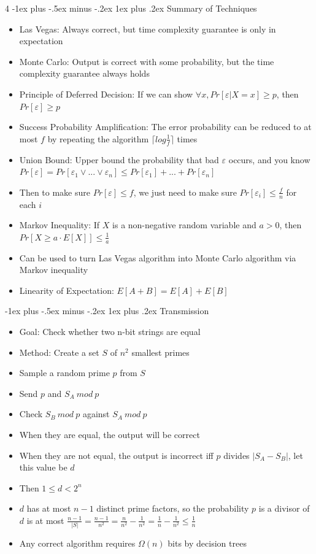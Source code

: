 \documentclass[10pt, landscape]{article}
\makeatletter
\renewcommand{\subsection}{\@startsection{subsection}{3}{0mm}%
                                {-1ex plus -.5ex minus -.2ex}%
                                {1ex plus .2ex}%
                                {\normalfont\small\bfseries}}%
\makeatother
\begin{document}
\begin{multicols*}{4}
\subsection{Summary of Techniques}
\begin{itemize}
    \item Las Vegas: Always correct, but time complexity guarantee is only in expectation
    \item Monte Carlo: Output is correct with some probability, but the time complexity guarantee always holds
    \item Principle of Deferred Decision: If we can show $\forall x , Pr[\varepsilon|X=x]\geq p$, then $Pr[\varepsilon]\geq p$
    \item Success Probability Amplification: The error probability can be reduced to at most $f$ by repeating the algorithm $\lceil log \frac{1}{f} \rceil$ times
    \item Union Bound: Upper bound the probability that bad $\varepsilon$ occurs, and you know $Pr[\varepsilon] =Pr[\varepsilon_1\lor ...\lor\varepsilon_n]\leq Pr[\varepsilon_1]+...+Pr[\varepsilon_n]$
    \item Then to make sure $Pr[\varepsilon]\leq f$, we just need to make sure $Pr[\varepsilon_i]\leq \frac{f}{n}$ for each $i$
    \item Markov Inequality: If $X$ is a non-negative random variable and $a>0$, then $Pr[X \geq a \cdot E[X]] \leq \frac{1}{a}$
    \item Can be used to turn Las Vegas algorithm into Monte Carlo algorithm via Markov inequality
    \item Linearity of Expectation: $E[A+B]=E[A]+E[B]$
\end{itemize}

\subsection{Transmission}
\begin{itemize}
    \item Goal: Check whether two n-bit strings are equal
    \item Method: Create a set $S$ of $n^2$ smallest primes
    \item Sample a random prime $p$ from $S$
    \item Send $p$ and $S_A\ mod\ p$
    \item Check $S_B\ mod\ p$ against $S_A\ mod\ p$
    \item When they are equal, the output will be correct
    \item When they are not equal, the output is incorrect iff $p$ divides $|S_A-S_B|$, let this value be $d$
    \item Then $1 \leq d < 2^n$
    \item $d$ has at most $n-1$ distinct prime factors, so the probability $p$ is a divisor of $d$ is at most $\frac{n-1}{|S|}=\frac{n-1}{n^2}=\frac{n}{n^2}-\frac{1}{n^2}=\frac{1}{n}-\frac{1}{n^2} \leq \frac{1}{n}$
    \item Any correct algorithm requires $\Omega(n)$ bits by decision trees
\end{itemize}


\end{multicols*}
\end{document}
